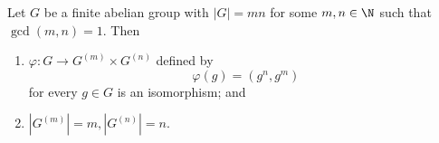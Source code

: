\documentclass[pmath347]{subfiles}
\begin{document}
    \begin{prop}{}
        Let $G$ be a finite abelian group with $\left| G \right| = mn$ for some $m,n\in\N$ such that $\gcd\left( m,n \right) = 1$. Then
        \begin{enumerate}
            \item $\varphi:G\to G^{\left( m \right) }\times G^{\left( n \right) }$ defined by
                \begin{equation*}
                    \varphi\left( g \right) = \left( g^n, g^m \right) 
                \end{equation*}
                for every $g\in G$ is an isomorphism; and
            \item $\left| G^{\left( m \right) } \right| = m, \left| G^{\left( n \right) } \right| = n$.
        \end{enumerate}
    \end{prop}
\end{document}
